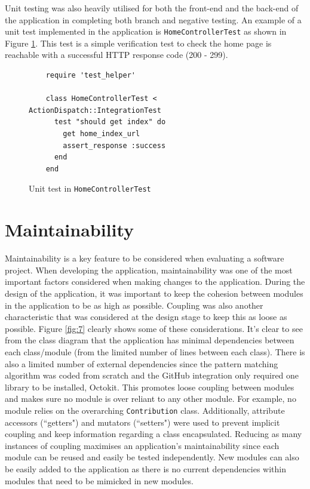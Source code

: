 Unit testing was also heavily utilised for both the front-end and the back-end of the application in completing both branch and negative testing. An example of a unit test implemented in the application is \texttt{HomeControllerTest} as shown in Figure \ref{fig:10}. This test is a simple verification test to check the home page is reachable with a successful HTTP response code (200 - 299). 

\begin{figure}[h]
    \centering
    \begin{verbatim}
    require 'test_helper'

    class HomeControllerTest < ActionDispatch::IntegrationTest
      test "should get index" do
        get home_index_url
        assert_response :success
      end
    end
    \end{verbatim}
    \caption{Unit test in \texttt{HomeControllerTest}}
    \label{fig:10}
\end{figure}

\section{Maintainability}

Maintainability is a key feature to be considered when evaluating a software project. When developing the application, maintainability was one of the most important factors considered when making changes to the application. During the design of the application, it was important to keep the cohesion between modules in the application to be as high as possible. Coupling was also another characteristic that was considered at the design stage to keep this as loose as possible. Figure \ref{fig:7} clearly shows some of these considerations. It's clear to see from the class diagram that the application has minimal dependencies between each class/module (from the limited number of lines between each class). There is also a limited number of external dependencies since the pattern matching algorithm was coded from scratch and the GitHub integration only required one library to be installed, Octokit. This promotes loose coupling between modules and makes sure no module is over reliant to any other module. For example, no module relies on the overarching \texttt{Contribution} class. Additionally, attribute accessors (``getters") and mutators (``setters") were used to prevent implicit coupling and keep information regarding a class encapsulated. Reducing as many instances of coupling maximises an application's maintainability since each module can be reused and easily be tested independently. New modules can also be easily added to the application as there is no current dependencies within modules that need to be mimicked in new modules.

